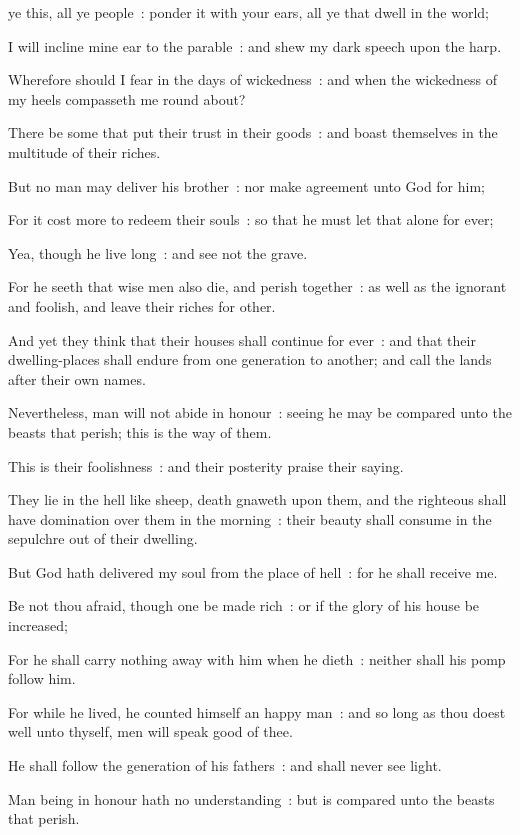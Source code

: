  ye this, all ye people~: ponder it with your ears, all ye that dwell in the world;\par
{}
I will incline mine ear to the parable~: and shew my dark speech upon the harp.\par
{}Wherefore should I fear in the days of wickedness~: and when the wickedness of my heels compasseth me round about?\par
{}There be some that put their trust in their goods~: and boast themselves in the multitude of their riches.\par
{}But no man may deliver his brother~: nor make agreement unto God for him;\par
{}For it cost more to redeem their souls~: so that he must let that alone for ever;\par
{}Yea, though he live long~: and see not the grave.\par
{}For he seeth that wise men also die, and perish together~: as well as the ignorant and foolish, and leave their riches for other.\par
{}And yet they think that their houses shall continue for ever~: and that their dwelling-places shall endure from one generation to another; and call the lands after their own names.\par
{}Nevertheless, man will not abide in honour~: seeing he may be compared unto the beasts that perish; this is the way of them.\par
{}This is their foolishness~: and their posterity praise their saying.\par
{}They lie in the hell like sheep, death gnaweth upon them, and the righteous shall have domination over them in the morning~: their beauty shall consume in the sepulchre out of their dwelling.\par
{}But God hath delivered my soul from the place of hell~: for he shall receive me.\par
{}Be not thou afraid, though one be made rich~: or if the glory of his house be increased;\par
{}For he shall carry nothing away with him when he dieth~: neither shall his pomp follow him.\par
{}For while he lived, he counted himself an happy man~: and so long as thou doest well unto thyself, men will speak good of thee.\par
{}He shall follow the generation of his fathers~: and shall never see light.\par
{}Man being in honour hath no understanding~: but is compared unto the beasts that perish.\par

